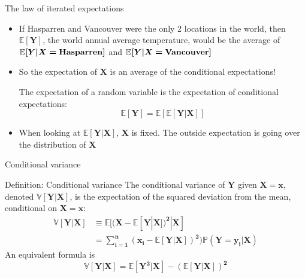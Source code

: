 \documentclass[
  ignorenonframetext,
  aspectratio=169]{beamer}
\providecommand{\tightlist}{%
  \setlength{\itemsep}{0pt}\setlength{\parskip}{0pt}}
\begin{document}
\begin{frame}{The law of iterated expectations}
\protect\hypertarget{the-law-of-iterated-expectations}{}
\begin{itemize}
\tightlist
\item
  If Hasparren and Vancouver were the only 2 locations in the world,
  then \(\bm{\mathbb{E}[Y]}\), the world annual average temperature,
  would be the average of
  \(\bm{\mathbb{E}[Y|X=}\textrm{\textbf{Hasparren}}\bm{ ]}\) and
  \(\bm{\mathbb{E}[Y|X=}\textrm{\textbf{Vancouver}} \bm{ ]}\)
\item
  So the expectation of \(\bm{X}\) is an average of the conditional
  expectations!

  \begin{thm*}
  The expectation of a random variable is the expectation of conditional expectations:
  $$
  \bm{\mathbb{E}[Y]=\mathbb{E}[\mathbb{E}[Y|X]]}
  $$
  \end{thm*}
\item
  When looking at \(\bm{\mathbb{E}[Y|X]}\), \(\bm{X}\) is fixed. The
  outside expectation is going over the distribution of \(\bm{X}\)
\end{itemize}
\end{frame}

\begin{frame}{Conditional variance}
\protect\hypertarget{conditional-variance}{}
\label{cond var}

\begin{block}{Definition: Conditional variance}
The conditional variance of $\bm{Y}$ given $\bm{X=x}$, denoted $\bm{\mathbb{V}[Y|X]}$, is the expectation of the squared deviation from the mean, conditional on $\bm{X=x}$: 
\begin{align*}
\bm{\mathbb{V}[Y|X]} & \bm{\equiv \mathbb{E}[(X - \mathbb{E}[Y|X])^2|X]}\\
                     & \bm{= \sum_{i = 1}^{n}(x_i-\mathbb{E}[Y|X])^2)\mathbb{P}(Y = y_i|X)}
\end{align*}
An equivalent formula is $$\bm{\mathbb{V}[Y|X]=\mathbb{E}[Y^2|X]- (\mathbb{E}[Y|X])^2  } $$
\end{block}
\end{frame}
\end{document}

